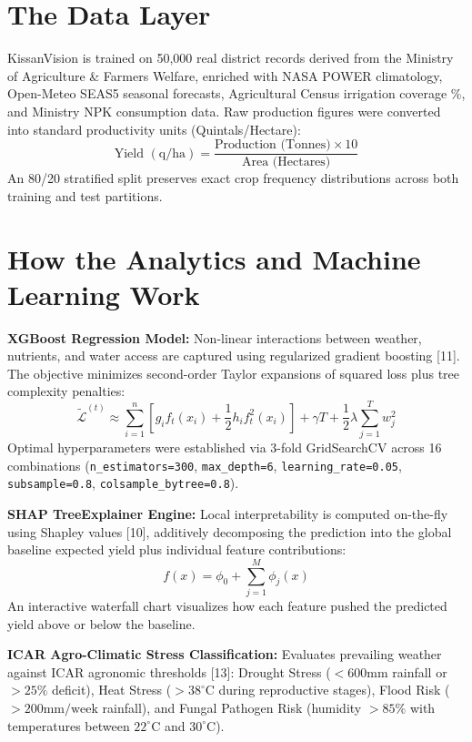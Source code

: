 \documentclass[11pt,a4paper]{report}
\begin{document}
\section{The Data Layer}
KissanVision is trained on 50,000 real district records derived from the Ministry of Agriculture \& Farmers Welfare, enriched with NASA POWER climatology, Open-Meteo SEAS5 seasonal forecasts, Agricultural Census irrigation coverage \%, and Ministry NPK consumption data. Raw production figures were converted into standard productivity units (Quintals/Hectare):
\begin{equation}
\text{Yield } (\text{q/ha}) = \frac{\text{Production (Tonnes)} \times 10}{\text{Area (Hectares)}}
\end{equation}
An 80/20 stratified split preserves exact crop frequency distributions across both training and test partitions.

\section{How the Analytics and Machine Learning Work}
\textbf{XGBoost Regression Model:} Non-linear interactions between weather, nutrients, and water access are captured using regularized gradient boosting [11]. The objective minimizes second-order Taylor expansions of squared loss plus tree complexity penalties:
\begin{equation}
\tilde{\mathcal{L}}^{(t)} \approx \sum_{i=1}^{n} \left[ g_i f_t(x_i) + \frac{1}{2} h_i f_t^2(x_i) \right] + \gamma T + \frac{1}{2} \lambda \sum_{j=1}^{T} w_j^2
\end{equation}
Optimal hyperparameters were established via 3-fold GridSearchCV across 16 combinations (\texttt{n\_estimators=300}, \texttt{max\_depth=6}, \texttt{learning\_rate=0.05}, \texttt{subsample=0.8}, \texttt{colsample\_bytree=0.8}).

\textbf{SHAP TreeExplainer Engine:} Local interpretability is computed on-the-fly using Shapley values [10], additively decomposing the prediction into the global baseline expected yield plus individual feature contributions:
\begin{equation}
f(x) = \phi_0 + \sum_{j=1}^{M} \phi_j(x)
\end{equation}
An interactive waterfall chart visualizes how each feature pushed the predicted yield above or below the baseline.

\textbf{ICAR Agro-Climatic Stress Classification:} Evaluates prevailing weather against ICAR agronomic thresholds [13]: Drought Stress ($<600\text{mm}$ rainfall or $>25\%$ deficit), Heat Stress ($>38^\circ\text{C}$ during reproductive stages), Flood Risk ($>200\text{mm/week}$ rainfall), and Fungal Pathogen Risk (humidity $>85\%$ with temperatures between $22^\circ\text{C}$ and $30^\circ\text{C}$).
\end{document}
